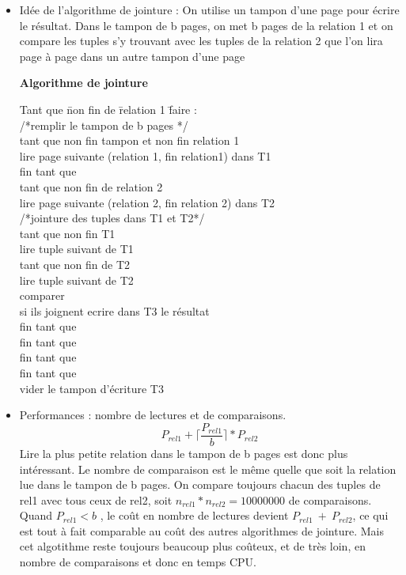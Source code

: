 \documentclass[11pt]{article}
\begin{document}
\begin{itemize}
\item Idée de l'algorithme de jointure :
On utilise un tampon d'une page pour écrire le résultat. Dans le tampon de b pages, on met b pages de la relation 1 et on compare les tuples s'y trouvant avec les tuples de la relation 2 que l'on lira page à page dans un autre tampon d'une page

\newpage
\textbf{Algorithme de jointure}
\begin{tabbing}
Tant que \=non fin de \= relation 1 \= faire : \=\\
\>/*remplir le tampon de b pages */\\
\>tant que non fin tampon et non fin relation 1\\
\>\>lire page suivante (relation 1, fin relation1) dans T1\\
\>fin tant que\\
\>tant que non fin de relation 2\\
\>\>lire page suivante (relation 2, fin relation 2) dans T2\\
\>\>/*jointure des tuples dans T1 et T2*/\\
\>\>tant que non fin T1\\
\>\>\>lire tuple suivant de T1\\
\>\>\>tant que non fin de T2\\
\>\>\>\>lire tuple suivant de T2\\
\>\>\>\>comparer\\
\>\>\>\>si ils joignent ecrire dans T3 le résultat\\
\>\>\>fin tant que\\
\>\>fin tant que\\
\>fin tant que\\
fin tant que\\
vider le tampon d'écriture T3\\\end{tabbing}

\item Performances : nombre de lectures et de comparaisons.\\ $$\boxed{P_{rel1} + \lceil{\frac{P_{rel1}}{b}}\rceil*P_{rel2}}$$
Lire la plus petite relation dans le tampon de b pages est donc plus intéressant.  Le nombre de comparaison est le même quelle que soit la relation lue dans le tampon de b pages. On compare toujours chacun des tuples de rel1 avec tous ceux de rel2, soit  $n_{rel1}*n_{rel2} = 10000000$ de comparaisons.
\\Quand $P_{rel1} < b$ , le coût en nombre de lectures devient $P_{rel1}~+~P_{rel2}$, ce qui est tout à fait comparable au coût des autres algorithmes de jointure. Mais cet algotithme reste toujours beaucoup plus coûteux, et de très loin, en nombre de comparaisons et donc en temps CPU.
\end{itemize}
\end{document}
